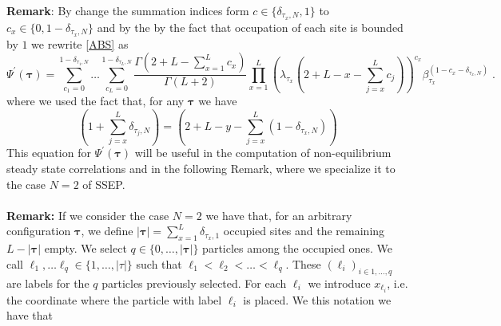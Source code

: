 \documentclass[10pt]{article}
\numberwithin{equation}{section}
\numberwithin{equation}{subsection}
\newcommand{\dt}{\;.}
\newcommand{\com}[1]{{ (* {\color{red}\small #1}*)}}
\begin{document}
\textbf{Remark}: By change the summation indices form $c\in \{\delta_{\tau_{x},N},1\}$ to $c_{x}\in \{0,1-\delta_{\tau_{x},N}\}$ and by the by the fact that occupation of each site is bounded by $1$ we rewrite \eqref{ABS} as 
\begin{equation}\label{ABS_1}
	\Psi^{'}(\bm{\tau})=\sum_{c_{1}=0}^{1-\delta_{\tau_{1},N}}\ldots\sum_{c_{L}=0}^{1-\delta_{\tau_{L},N}}\frac{\Gamma(2+L-\sum_{x=1}^{L}c_{x})}{\Gamma(L+2)}\prod_{x=1}^{L}\left(\lambda_{\tau_{x}}\left(2+L-x-\sum_{j=x}^{L}c_{j}\right)\right)^{c_{x}}\beta_{\tau_{x}}^{(1-c_{x}-\delta_{\tau_{x},N})}\dt
\end{equation}
 where we used the fact that, for any $\bm{\tau}$ we have 
\begin{equation}
	\left(1+\sum_{j=x}^{L}\delta_{\tau_{j},N}\right) =\left(2+L-y-\sum_{j=x}^{L}(1-\delta_{\tau_{x},N})\right)
\end{equation}
This equation for $\Psi^{'}(\bm{\tau})$ will be useful in the computation of non-equilibrium steady state correlations and in the following Remark, where we specialize it to the case $N=2$ of SSEP. \\ \\
\textbf{Remark:} If we consider the case $N=2$ we have that, for an arbitrary configuration $\bm{\tau}$, we define $|\bm{\tau}|=\sum_{x=1}^{L}\delta_{\tau_{x},1}$ occupied sites and the remaining $L-|\bm{\tau}|$ empty. We select $q\in\{0,\ldots,|\bm{\tau}|\}$ particles among the occupied ones. We call $\ell_{1},\ldots\ell_{q}\in \{1,\ldots,|\tau|\}$ such that $\ell_{1}<\ell_{2}<\ldots<\ell_{q}$. These $(\ell_{i})_{i\in {1,\ldots,q}}$ are labels for the $q$ particles previously selected. For each $\ell_{i}$ we introduce $x_{\ell_{i}}$, i.e. the coordinate where the particle with label $\ell_{i}$ is placed. We this notation we have that 
\end{document}
